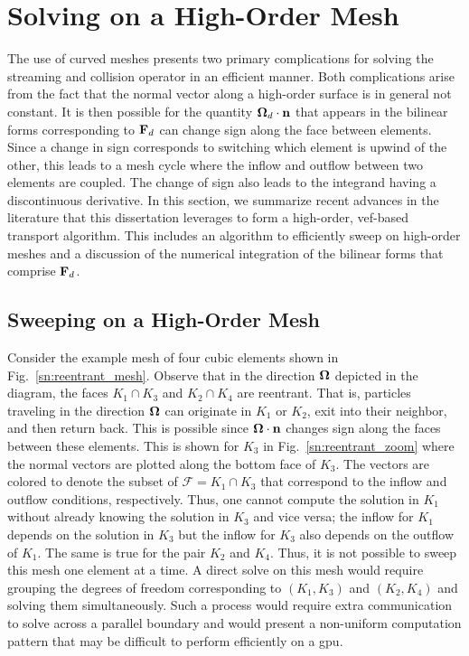 \documentclass[../doc.tex]{subfiles}
\begin{document}
\section{Solving on a High-Order Mesh} \label{sn_sec:hosweep}
The use of curved meshes presents two primary complications for solving the streaming and collision operator in an efficient manner. Both complications arise from the fact that the normal vector along a high-order surface is in general not constant. It is then possible for the quantity $\boldsymbol{\Omega}_d\cdot\boldsymbol{\mathrm{n}}$ that appears in the bilinear forms corresponding to $\boldsymbol{\mathrm{F}}_d$ can change sign along the face between elements. Since a change in sign corresponds to switching which element is upwind of the other, this leads to a mesh cycle where the inflow and outflow between two elements are coupled. The change of sign also leads to the integrand having a discontinuous derivative. In this section, we summarize recent advances in the literature that this dissertation leverages to form a high-order, \gls{vef}-based transport algorithm. This includes an algorithm to efficiently sweep on high-order meshes and a discussion of the numerical integration of the bilinear forms that comprise $\boldsymbol{\mathrm{F}}_d$. 

\subsection{Sweeping on a High-Order Mesh}
Consider the example mesh of four cubic elements shown in Fig.~\ref{sn:reentrant_mesh}. 
Observe that in the direction $\boldsymbol{\Omega}$ depicted in the diagram, the faces $K_1 \cap K_3$ and $K_2 \cap K_4$ are reentrant. That is, particles traveling in the direction $\boldsymbol{\Omega}$ can originate in $K_1$ or $K_2$, exit into their neighbor, and then return back. This is possible since $\boldsymbol{\Omega}\cdot\boldsymbol{\mathrm{n}}$ changes sign along the faces between these elements. This is shown for $K_3$ in Fig.~\ref{sn:reentrant_zoom} where the normal vectors are plotted along the bottom face of $K_3$. The vectors are colored to denote the subset of $\mathcal{F} = K_1\cap K_3$ that correspond to the inflow and outflow conditions, respectively. Thus, one cannot compute the solution in $K_1$ without already knowing the solution in $K_3$ and vice versa; the inflow for $K_1$ depends on the solution in $K_3$ but the inflow for $K_3$ also depends on the outflow of $K_1$. The same is true for the pair $K_2$ and $K_4$. Thus, it is not possible to sweep this mesh one element at a time. A direct solve on this mesh would require grouping the degrees of freedom corresponding to $(K_1, K_3)$ and $(K_2,K_4)$ and solving them simultaneously. Such a process would require extra communication to solve across a parallel boundary and would present a non-uniform computation pattern that may be difficult to perform efficiently on a \gls{gpu}.  
\end{document}
